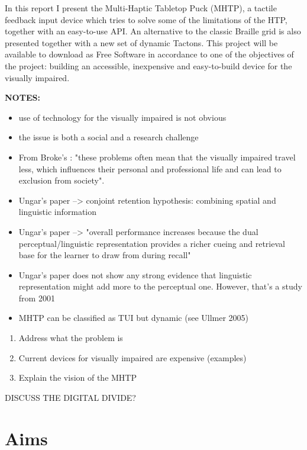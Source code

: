 In this report I present the Multi-Haptic Tabletop Puck (MHTP), a tactile feedback input device which tries to solve some of the limitations of the HTP, together with an easy-to-use API. An alternative to the classic Braille grid is also presented together with a new set of dynamic Tactons. This project will be available to download as Free Software in accordance to one of the objectives of the project: building an accessible, inexpensive and easy-to-build device for the visually impaired. \par


\textbf{NOTES:}

\begin{itemize}
	\item use of technology for the visually impaired is not obvious
    \item the issue is both a social and a research challenge
    \item From Broke's : "these problems often mean that the visually impaired travel less, which influences their personal and professional life and can lead to exclusion from society".
    \item Ungar's paper --> conjoint retention hypothesis: combining spatial and linguistic information
    \item Ungar's paper --> "overall performance increases because the dual perceptual/linguistic representation provides a richer cueing and retrieval base for the learner to draw from during recall"
    \item Ungar's paper does not show any strong evidence that linguistic representation might add more to the perceptual one. However, that's a study from 2001
    \item MHTP can be classified as TUI but dynamic (see Ullmer 2005)
\end{itemize}

\begin{enumerate}
    	\item Address what the problem is
        \item Current devices for visually impaired are expensive (examples)
        \item Explain the vision of the MHTP
  	\end{enumerate}
    
DISCUSS THE DIGITAL DIVIDE? 
    
\section{Aims}

